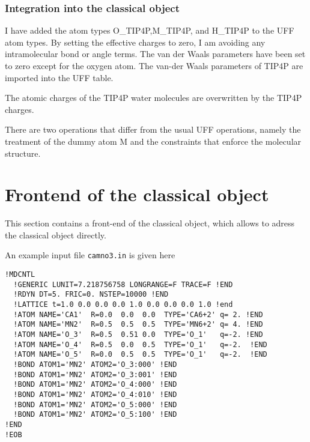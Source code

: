\documentclass[11pt,a4paper]{report}
\begin{document}
\subsection{Integration into the classical object}

I have added the atom types O\_TIP4P,M\_TIP4P, and H\_TIP4P to the UFF
atom types. By setting the effective charges to zero, I am avoiding
any intramolecular bond or angle terms. The van der Waals parameters
have been set to zero except for the oxygen atom. The van-der Waals
parameters of TIP4P are imported into the UFF table.

The atomic charges of the TIP4P water molecules are overwritten by the
TIP4P charges.

There are two operations that differ from the usual UFF operations,
namely the treatment of the dummy atom M and the constraints that
enforce the molecular structure.


\appendix
\chapter{Frontend of the classical object}
\label{sec:frontend}
This section contains a front-end of the classical object, which
allows to adress the classical object directly.


An example input file \verb|camno3.in| is given here
\begin{verbatim} 
!MDCNTL
  !GENERIC LUNIT=7.218756758 LONGRANGE=F TRACE=F !END
  !RDYN DT=5. FRIC=0. NSTEP=10000 !END
  !LATTICE t=1.0 0.0 0.0 0.0 1.0 0.0 0.0 0.0 1.0 !end
  !ATOM NAME='CA1'  R=0.0  0.0  0.0  TYPE='CA6+2' q= 2. !END
  !ATOM NAME='MN2'  R=0.5  0.5  0.5  TYPE='MN6+2' q= 4. !END
  !ATOM NAME='O_3'  R=0.5  0.51 0.0  TYPE='O_1'   q=-2. !END
  !ATOM NAME='O_4'  R=0.5  0.0  0.5  TYPE='O_1'   q=-2.  !END
  !ATOM NAME='O_5'  R=0.0  0.5  0.5  TYPE='O_1'   q=-2.  !END
  !BOND ATOM1='MN2' ATOM2='O_3:000' !END
  !BOND ATOM1='MN2' ATOM2='O_3:001' !END
  !BOND ATOM1='MN2' ATOM2='O_4:000' !END
  !BOND ATOM1='MN2' ATOM2='O_4:010' !END
  !BOND ATOM1='MN2' ATOM2='O_5:000' !END
  !BOND ATOM1='MN2' ATOM2='O_5:100' !END
!END
!EOB
\end{verbatim}
\end{document}
